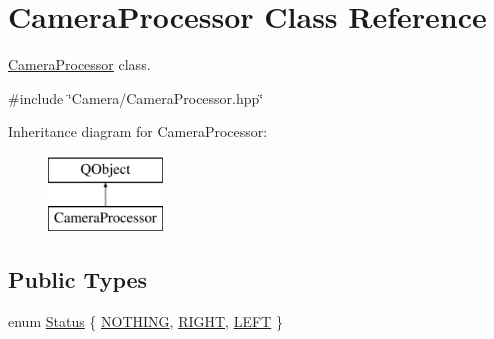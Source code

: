 \hypertarget{class_camera_processor}{}\section{Camera\+Processor Class Reference}
\label{class_camera_processor}


\hyperlink{class_camera_processor}{Camera\+Processor} class.  




{\ttfamily \#include \char`\"{}Camera/\+Camera\+Processor.\+hpp\char`\"{}}

Inheritance diagram for Camera\+Processor\+:\begin{figure}[H]
\begin{center}
\leavevmode
\includegraphics[height=2.000000cm]{class_camera_processor}
\end{center}
\end{figure}
\subsection*{Public Types}
\begin{DoxyCompactItemize}
\item 
enum \hyperlink{class_camera_processor_a302481f2bda71ed63fda97d280abe128}{Status} \{ \hyperlink{class_camera_processor_a302481f2bda71ed63fda97d280abe128a5d7756fd07a0e2a716fa3285b6649c63}{N\+O\+T\+H\+I\+N\+G}, 
\hyperlink{class_camera_processor_a302481f2bda71ed63fda97d280abe128a7576fb4180d941a33d45e64395f26827}{R\+I\+G\+H\+T}, 
\hyperlink{class_camera_processor_a302481f2bda71ed63fda97d280abe128aea3db9eb5edbbbec72fc4492a5f1d6e1}{L\+E\+F\+T}
 \}
\end{DoxyCompactItemize}
